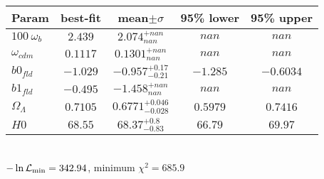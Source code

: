 \begin{tabular}{|l|c|c|c|c|} 
 \hline 
Param & best-fit & mean$\pm\sigma$ & 95\% lower & 95\% upper \\ \hline 
$100~\omega_{b }$ &$2.439$ & $2.074_{nan}^{+nan}$ & $nan$ & $nan$ \\ 
$\omega_{cdm }$ &$0.1117$ & $0.1301_{nan}^{+nan}$ & $nan$ & $nan$ \\ 
$b0_{fld }$ &$-1.029$ & $-0.957_{-0.21}^{+0.17}$ & $-1.285$ & $-0.6034$ \\ 
$b1_{fld }$ &$-0.495$ & $-1.458_{nan}^{+nan}$ & $nan$ & $nan$ \\ 
$\Omega_{\Lambda }$ &$0.7105$ & $0.6771_{-0.028}^{+0.046}$ & $0.5979$ & $0.7416$ \\ 
$H0$ &$68.55$ & $68.37_{-0.83}^{+0.8}$ & $66.79$ & $69.97$ \\ 
\hline 
 \end{tabular} \\ 
$-\ln{\cal L}_\mathrm{min} =342.94$, minimum $\chi^2=685.9$ \\ 
